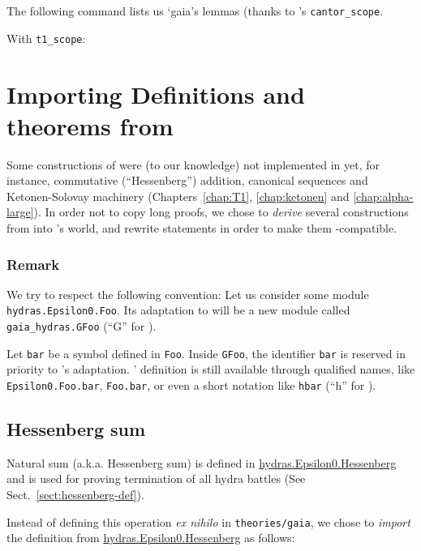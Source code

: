 The following command lists us `gaia's lemmas (thanks to
\gaia's  \texttt{cantor\_scope}.

With \texttt{t1\_scope}:

\section{Importing Definitions and theorems from \HydrasLib}

Some constructions of \HydrasLib were (to our knowledge) not implemented in \gaia yet, for instance, commutative (``Hessenberg'') addition, canonical sequences and Ketonen-Solovay machinery (Chapters~\ref{chap:T1}, \ref{chap:ketonen} and \ref{chap:alpha-large}). In order not to copy long proofs, we chose to
\emph{derive} several constructions from \HydrasLib into \gaia's world, and rewrite \HydrasLib statements in order to make them \gaia-compatible.


\subsubsection{Remark}
\label{sect:gaia-masking}
We try to respect the following convention:
Let us consider  some module \texttt{hydras.Epsilon0.Foo}.
Its adaptation to \gaia will be a new module called \linebreak
\texttt{gaia\_hydras.GFoo} (``G'' for \gaia).

Let \texttt{bar} be a symbol defined in \texttt{Foo}.
Inside \texttt{GFoo}, the identifier \texttt{bar}
  is reserved in priority to \gaia's adaptation.
  \HydrasLib' definition is still available through qualified names, like \texttt{Epsilon0.Foo.bar}, \texttt{Foo.bar}, or even a short notation like \texttt{hbar}  (``h'' for \HydrasLib).

  
\subsection{Hessenberg sum}
Natural sum  (a.k.a. Hessenberg  sum) is defined in
\href{../theories/html/hydras.Epsilon0.Hessenberg.html}{hydras.Epsilon0.Hessenberg} and is used for proving termination of all hydra battles (See Sect.~\ref{sect:hessenberg-def}).

Instead of defining this operation \emph{ex nihilo} in \texttt{theories/gaia}, we chose to \emph{import} the definition
from \href{../theories/html/hydras.Epsilon0.Hessenberg.html}{hydras.Epsilon0.Hessenberg} as follows:

